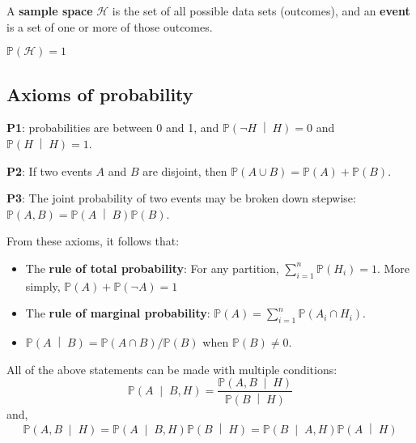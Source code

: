 \documentclass[titlepage, 12pt, leqno]{article}
\begin{document}
\begin{definition}
    A \textbf{sample space} $ \mathcal{H}$ is the set of all possible data sets
    (outcomes), and an \textbf{event} is a set of one or more of those outcomes.
    \begin{note}
        $\mathbb{P}( \mathcal{H}) = 1$
    \end{note}
\end{definition}

\subsection{Axioms of probability}
\textbf{P1}: probabilities are between 0 and 1, and 
$ \mathbb{P}\left( \neg H \;\middle|\; H\right) =0$ and
$ \mathbb{P}\left(H \;\middle|\; H\right) =1$.

\textbf{P2}: If two events $A$ and $B$ are disjoint, then $\mathbb{P}(A
\cup B) = \mathbb{P}(A) + \mathbb{P}(B)$.

\textbf{P3}: The joint probability of two events may be broken down stepwise:
$\mathbb{P}(A,B) = \mathbb{P}\left(A \;\middle|\; B\right) \mathbb{P}(B)$.

From these axioms, it follows that:
\begin{itemize}
    \item The \textbf{rule of total probability}: 
        For any partition, $\sum_{i=1}^{n}\mathbb{P}(H_i)=1$. More simply,
        $\mathbb{P}(A) + \mathbb{P}(\neg A) = 1$
    \item The \textbf{rule of marginal probability}: $\mathbb{P}(A) =
        \sum_{i=1}^{n}\mathbb{P}(A_i \cap H_i)$. 
    \item $ \mathbb{P}\left(A \;\middle|\; B\right) = \mathbb{P}(A \cap B) /
        \mathbb{P}(B)$ when $\mathbb{P}(B) \ne 0$.
\end{itemize}

\begin{note}
    All of the above statements can be made with multiple conditions:
    \[
        \mathbb{P}\left(A \;\middle|\; B,H\right) = 
        \frac{ \mathbb{P}\left(A,B \;\middle|\; H\right) }{
        \mathbb{P}\left(B \;\middle|\; H\right)}
    \]
    and,
    \[
        \mathbb{P}\left(A,B \;\middle|\; H\right) =
        \mathbb{P}\left(A \;\middle|\; B,H\right) \mathbb{P}\left(B \;\middle|\; 
        H\right) = \mathbb{P}\left(B \;\middle|\; A,H\right) \mathbb{P}\left(A 
        \;\middle|\; H\right) 
    \]
\end{note}
\end{document}
